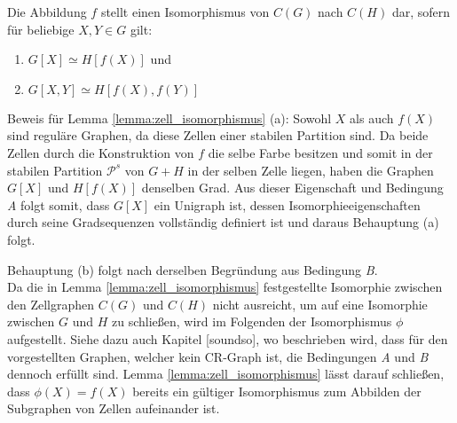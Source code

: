 \begin{Lemma}
	Die Abbildung $f$ stellt einen Isomorphismus von $C(G)$ nach $C(H)$ dar, sofern für beliebige $X,Y\in G$ gilt:
	\begin{enumerate}[label=(\alph*)]
		\item $G[X]\simeq H[f(X)]$ und
		\item $G[X,Y]\simeq H[f(X),f(Y)]$
	\end{enumerate}
	\label{lemma:zell_isomorphismus}
\end{Lemma}

Beweis für Lemma \ref{lemma:zell_isomorphismus} (a):
Sowohl $X$ als auch $f(X)$ sind reguläre Graphen, da diese Zellen einer stabilen Partition sind.
Da beide Zellen durch die Konstruktion von $f$ die selbe Farbe besitzen und somit in der stabilen Partition $\mathcal{P}^s$ von $G+H$ in der selben Zelle liegen, haben die Graphen $G[X]$ und $H[f(X)]$ denselben Grad.
Aus dieser Eigenschaft und Bedingung \emph{A} folgt somit, dass $G[X]$ ein Unigraph ist, dessen Isomorphieeigenschaften durch seine Gradsequenzen vollständig definiert ist und daraus Behauptung (a) folgt.

Behauptung (b) folgt nach derselben Begründung aus Bedingung \emph{B}.\\

Da die in Lemma \ref{lemma:zell_isomorphismus} festgestellte Isomorphie zwischen den Zellgraphen $C(G)$ und $C(H)$ nicht ausreicht, um auf eine Isomorphie zwischen $G$ und $H$ zu schließen, wird im Folgenden der Isomorphismus $\phi $ aufgestellt.
Siehe dazu auch Kapitel [soundso], wo beschrieben wird, dass für den vorgestellten Graphen, welcher kein CR-Graph ist, die Bedingungen \emph{A} und \emph{B} dennoch erfüllt sind. %
Lemma \ref{lemma:zell_isomorphismus} lässt darauf schließen, dass $\phi (X)=f(X)$ bereits ein gültiger Isomorphismus zum Abbilden der Subgraphen von Zellen aufeinander ist.

